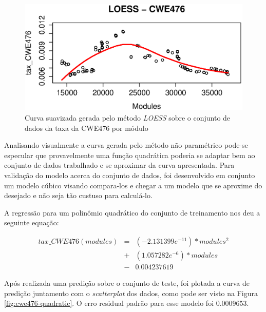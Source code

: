 \begin{figure}[h]
  \centering
  \includegraphics[width=1.0\textwidth]
      {figuras/cwe476-loess.eps}
      \caption{Curva suavizada gerada pelo método \textit{LOESS} sobre o
      conjunto de dados da taxa da CWE476 por módulo}
  \label{fig:cwe476-loess}
\end{figure}

Analisando visualmente a curva gerada pelo método não paramétrico pode-se
especular que provavelmente uma função quadrática poderia se adaptar bem ao
conjunto de dados trabalhado e se aproximar da curva apresentada. Para validação
do modelo acerca do conjunto de dados, foi desenvolvido em conjunto um modelo
cúbico visando compara-los e chegar a um modelo que se aproxime do desejado e
não seja tão custuso para calculá-lo. 

A regressão para um polinômio quadrático do conjunto de treinamento nos deu a
seguinte equação:


 \begin{align*}
  tax\_CWE476(modules) &=& (-2.131399e^{-11}) * modules^{2} \\
                       &+& (1.057282e^{-6}) * modules \\
                       &-& 0.004237619 
 \end{align*}



Após realizada uma predição sobre o conjunto de teste, foi plotada a curva de
predição juntamento com o \textit{scatterplot} dos dados, como pode ser visto na
Figura \ref{fig:cwe476-quadratic}. O erro residual padrão para esse modelo foi
0.0009653.


